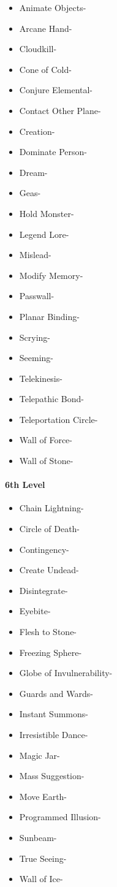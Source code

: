 \documentclass[
]{article}
\providecommand{\tightlist}{%
  \setlength{\itemsep}{0pt}\setlength{\parskip}{0pt}}
\begin{document}
\begin{itemize}
\tightlist
\item
  Animate Objects-
\item
  Arcane Hand-
\item
  Cloudkill-
\item
  Cone of Cold-
\item
  Conjure Elemental-
\item
  Contact Other Plane-
\item
  Creation-
\item
  Dominate Person-
\item
  Dream-
\item
  Geas-
\item
  Hold Monster-
\item
  Legend Lore-
\item
  Mislead-
\item
  Modify Memory-
\item
  Passwall-
\item
  Planar Binding-
\item
  Scrying-
\item
  Seeming-
\item
  Telekinesis-
\item
  Telepathic Bond-
\item
  Teleportation Circle-
\item
  Wall of Force-
\item
  Wall of Stone-
\end{itemize}

\hypertarget{6th-level-5}{%
\paragraph{6th Level}\label{6th-level-5}}

\begin{itemize}
\tightlist
\item
  Chain Lightning-
\item
  Circle of Death-
\item
  Contingency-
\item
  Create Undead-
\item
  Disintegrate-
\item
  Eyebite-
\item
  Flesh to Stone-
\item
  Freezing Sphere-
\item
  Globe of Invulnerability-
\item
  Guards and Wards-
\item
  Instant Summons-
\item
  Irresistible Dance-
\item
  Magic Jar-
\item
  Mass Suggestion-
\item
  Move Earth-
\item
  Programmed Illusion-
\item
  Sunbeam-
\item
  True Seeing-
\item
  Wall of Ice-
\end{itemize}
\end{document}
